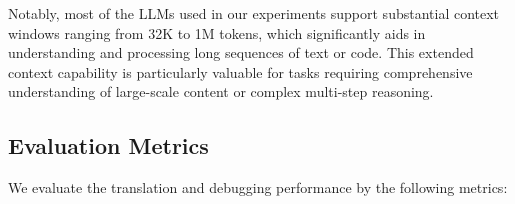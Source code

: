 Notably, most of the LLMs used in our experiments support substantial context windows ranging from 32K to 1M tokens, which significantly aids in understanding and processing long sequences of text or code. This extended context capability is particularly valuable for tasks requiring comprehensive understanding of large-scale content or complex multi-step reasoning.


\begin{table}[t]
  \centering
  \footnotesize
  \setlength\tabcolsep{8pt}
  \caption{The selection of backbone LLMs.}
  \renewcommand{\arraystretch}{1.3}
%
 \label{table:models}
\end{table}


\subsection{Evaluation Metrics}
\label{EvaluationMetrics}

We evaluate the translation and debugging performance by the following metrics:

